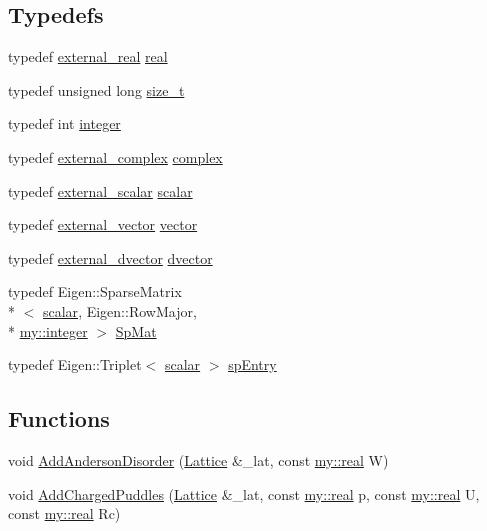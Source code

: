 \subsection*{Typedefs}
\begin{DoxyCompactItemize}
\item 
typedef \hyperlink{types__definitions_8hpp_afcf02aefd75cea1c0178a18bbfcb3d1a}{external\+\_\+real} \hyperlink{namespaceNumCal_ac10564761316cff6fb75fe8bfccd6def}{real}
\item 
typedef unsigned long \hyperlink{namespaceNumCal_aa3e2bbd7c48c91db220faeb896cd15a4}{size\+\_\+t}
\item 
typedef int \hyperlink{namespaceNumCal_ae1031b42812e871d8f5bd9b7b15fc7d8}{integer}
\item 
typedef \hyperlink{types__definitions_8hpp_a4c933564179b32b78cb338ca417616a8}{external\+\_\+complex} \hyperlink{namespaceNumCal_a04c5555bf4fddc076c41cc9440db4645}{complex}
\item 
typedef \hyperlink{types__definitions_8hpp_af5c52aebac57703de05e631d36a8ef2e}{external\+\_\+scalar} \hyperlink{namespaceNumCal_a45f8f32ea0c2b926caa1ad763bd77c96}{scalar}
\item 
typedef \hyperlink{types__definitions_8hpp_aea218327e998c8c8c583f91564afd1b4}{external\+\_\+vector} \hyperlink{namespaceNumCal_a271636c96b503821b7d9017cb419928a}{vector}
\item 
typedef \hyperlink{types__definitions_8hpp_ac4a55bdf0574672fe1bf23fe295feaf4}{external\+\_\+dvector} \hyperlink{namespaceNumCal_a455906c1d5486d136db3a82f48ed412d}{dvector}
\item 
typedef Eigen\+::\+Sparse\+Matrix\\*
$<$ \hyperlink{namespaceNumCal_a45f8f32ea0c2b926caa1ad763bd77c96}{scalar}, Eigen\+::\+Row\+Major, \\*
\hyperlink{namespacemy_a42365393c537edae1e89d20ff90d1923}{my\+::integer} $>$ \hyperlink{namespaceNumCal_a7250a9391da84db7147d9e05c8d3f137}{Sp\+Mat}
\item 
typedef Eigen\+::\+Triplet$<$ \hyperlink{namespaceNumCal_a45f8f32ea0c2b926caa1ad763bd77c96}{scalar} $>$ \hyperlink{namespaceNumCal_a79ecf3f91c119611dbbd9194c2511bec}{sp\+Entry}
\end{DoxyCompactItemize}
\subsection*{Functions}
\begin{DoxyCompactItemize}
\item 
void \hyperlink{namespaceNumCal_a50e18f1f5b68be5796103ee981c836e5}{Add\+Anderson\+Disorder} (\hyperlink{classNumCal_1_1Lattice}{Lattice} \&\+\_\+lat, const \hyperlink{namespacemy_ad61baeaeda728a4c48dd64f93e44a46c}{my\+::real} W)
\item 
void \hyperlink{namespaceNumCal_ae2d5d31cf01e9a644fcc8083389c7345}{Add\+Charged\+Puddles} (\hyperlink{classNumCal_1_1Lattice}{Lattice} \&\+\_\+lat, const \hyperlink{namespacemy_ad61baeaeda728a4c48dd64f93e44a46c}{my\+::real} p, const \hyperlink{namespacemy_ad61baeaeda728a4c48dd64f93e44a46c}{my\+::real} U, const \hyperlink{namespacemy_ad61baeaeda728a4c48dd64f93e44a46c}{my\+::real} Rc)
\end{DoxyCompactItemize}


